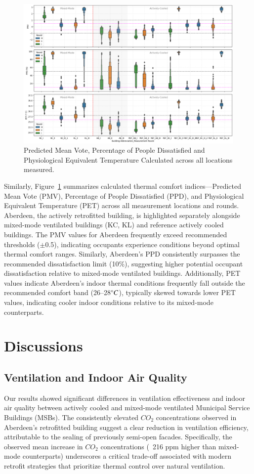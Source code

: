\documentclass[preprint,12pt]{elsarticle}
\begin{document}
\begin{figure}[h!]
    \centering
    \includegraphics[width=0.95\linewidth]{COST_COMF.png}
    \caption{Predicted Mean Vote, Percentage of People Dissatisfied and Physiological Equivalent Temperature Calculated across all locations measured.}
    \label{fig:pmv3}
\end{figure}

Similarly, Figure~\ref{fig:pmv3} summarizes calculated thermal comfort indices—Predicted Mean Vote (PMV), Percentage of People Dissatisfied (PPD), and Physiological Equivalent Temperature (PET) across all measurement locations and rounds. Aberdeen, the actively retrofitted building, is highlighted separately alongside mixed-mode ventilated buildings (KC, KL) and reference actively cooled buildings. The PMV values for Aberdeen frequently exceed recommended thresholds ($\pm$0.5), indicating occupants experience conditions beyond optimal thermal comfort ranges. Similarly, Aberdeen’s PPD consistently surpasses the recommended dissatisfaction limit (10\%), suggesting higher potential occupant dissatisfaction relative to mixed-mode ventilated buildings. Additionally, PET values indicate Aberdeen’s indoor thermal conditions frequently fall outside the recommended comfort band (26–28$\degree C$), typically skewed towards lower PET values, indicating cooler indoor conditions relative to its mixed-mode counterparts.


\section{Discussions}
\subsection{Ventilation and Indoor Air Quality}
Our results showed significant differences in ventilation effectiveness and indoor air quality between actively cooled and mixed-mode ventilated Municipal Service Buildings (MSBs). The consistently elevated $CO_2$ concentrations observed in Aberdeen’s retrofitted building suggest a clear reduction in ventilation efficiency, attributable to the sealing of previously semi-open facades. Specifically, the observed mean increase in $CO_2$ concentrations (~216 ppm higher than mixed-mode counterparts) underscores a critical trade-off associated with modern retrofit strategies that prioritize thermal control over natural ventilation.
\end{document}
